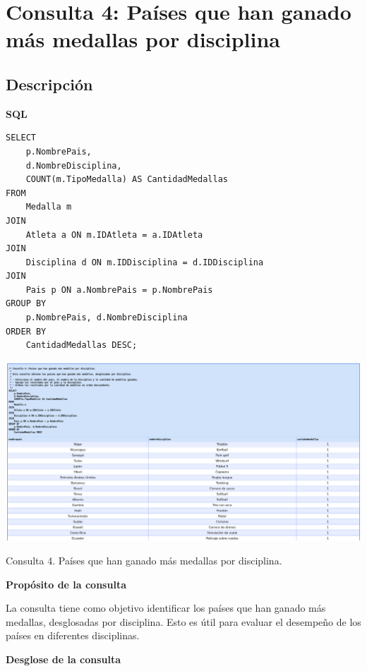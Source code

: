 \section*{Consulta 4: Países que han ganado más medallas por disciplina}

\subsection*{Descripción}

\textbf{SQL}

\begin{verbatim}
SELECT 
    p.NombrePais,
    d.NombreDisciplina,
    COUNT(m.TipoMedalla) AS CantidadMedallas
FROM 
    Medalla m
JOIN 
    Atleta a ON m.IDAtleta = a.IDAtleta
JOIN 
    Disciplina d ON m.IDDisciplina = d.IDDisciplina
JOIN 
    Pais p ON a.NombrePais = p.NombrePais
GROUP BY 
    p.NombrePais, d.NombreDisciplina
ORDER BY 
    CantidadMedallas DESC;
\end{verbatim}

\begin{center}
    \includegraphics[width=16.5cm]{resources/Chapters/Consultas/Imagenes/Consulta4.jpeg} 
    
   Consulta 4. Países que han ganado más medallas por disciplina.
\end{center}

\textbf{Propósito de la consulta}

La consulta tiene como objetivo identificar los países que han ganado más medallas, desglosadas por disciplina. Esto es útil para evaluar el desempeño de los países en diferentes disciplinas.

\textbf{Desglose de la consulta}

